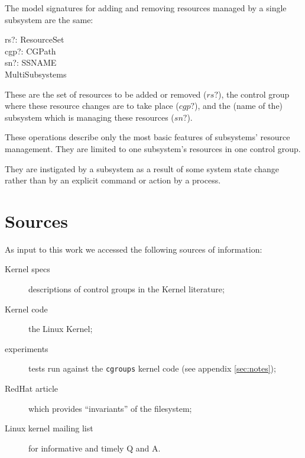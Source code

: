 \documentclass[a4paper,twoside,12pt]{article}
\begin{document}
The model signatures for adding and removing resources managed by a single subsystem are the same:

\begin{schema*}
    rs?: ResourceSet \\
    cgp?: CGPath \\
    sn?: SSNAME \\
\also
    \Delta MultiSubsystems
\end{schema*}
These are the set of resources to be added or removed ($rs?$), the control group where these resource changes are to take place ($cgp?$), 
and the (name of the) subsystem which is managing these resources ($sn?$).

These operations describe only the most basic features of subsystems' resource management.
They are limited to one subsystem's resources in one control group.

They are instigated by a subsystem as a result of some system state change rather 
than by an explicit command or action by a process.



\clearpage

\appendix




\section{Sources}
\label{sec:sources}

As input to this work we accessed the following sources of information:
\begin{description}
\item[Kernel specs] descriptions of control groups in the Kernel literature\cite{linuxgroups};
\item[Kernel code] the Linux Kernel\cite{linuxkernel};
\item[experiments] tests run against the \texttt{cgroups} kernel code (see appendix \ref{sec:notes});
\item[RedHat article] which provides ``invariants'' of the filesystem\cite{rharticle};
\item[Linux kernel mailing list] for informative and timely Q and A\cite{noop}.
\end{description}
\end{document}
